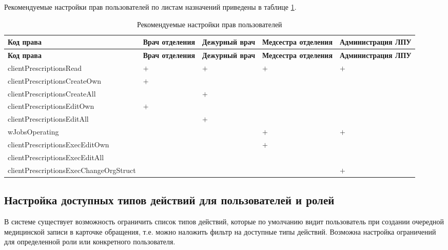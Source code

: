 Рекомендуемые настройки прав пользователей по листам назначений приведены в таблице \ref{tbl_acs_roles_ln}.

{\small
\begin{longtable}{|p{7.6cm}|p{2.1cm}|p{2.1cm}|p{2.1cm}|p{2.1cm}|}
\caption{Рекомендуемые настройки прав пользователей \label{tbl_acs_roles_ln}} \\
\hline \rule{0pt}{15pt} \centering \textbf{Код права} & \centering \textbf{Врач отделения} & \centering \textbf{Дежур\-ный врач} & \centering \textbf{Медсест\-ра отделения} & \textbf{Админист\-ра\-ция ЛПУ} \\ \hline
\endfirsthead
\hline \rule{0pt}{15pt} \centering \textbf{Код права} & \centering \textbf{Врач отделения} & \centering \textbf{Дежур\-ный врач} & \centering \textbf{Медсест\-ра отделения} & \textbf{Адми\-нист\-ра\-ция ЛПУ} \\ \hline
\endhead			
clientPrescriptionsRead &	\centering $+$	&	\centering $+$		&	\centering $+$ & \hfil $+$ \\ \hline
clientPrescriptionsCreateOwn &		\centering $+$	& & & \\ \hline		
clientPrescriptionsCreateAll & &	\centering $+$ & & \\ \hline		
clientPrescriptionsEditOwn	&	\centering $+$ & & & \\ \hline			
clientPrescriptionsEditAll	&	&	\centering $+$ & & \\ \hline		
wJobsOperating	& &	 & 	\centering $+$	& \hfil $+$ \\ \hline
clientPrescriptionsExecEditOwn & & & \centering $+$ & \\ \hline	
clientPrescriptionsExecEditAll	& & & & \\ \hline			
clientPrescriptionsExecChangeOrgStruct	& & & & \hfil $+$ \\ \hline
\end{longtable}
}

\subsection{Настройка доступных типов действий для пользователей и ролей}

В системе существует возможность ограничить список типов действий, которые по умолчанию видит пользователь при создании очередной медицинской записи в карточке обращения, т.е. можно наложить фильтр на доступные типы действий. Возможна настройка ограничений для определенной роли или конкретного пользователя.

